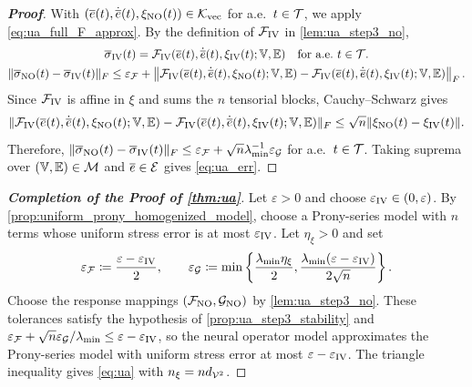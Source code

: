 \begin{proof}[\bf Proof]
With $(\overline e(t),\dot{\overline e}(t),\xi_{\mathrm{NO}}(t))\in{\mathcal{K}}_{\mathrm{vec}}$ for a.e.\ $t\in{\mathcal{T}}$, we apply \cref{eq:ua_full_F_approx}. By the definition of ${\mathcal{F}}_{\mathrm{IV}}$ in \cref{lem:ua_step3_no},
\begin{gather*}
{\overline\sigma_{\rm IV}}(t)={\mathcal{F}}_{\mathrm{IV}}(\overline e(t),\dot{\overline e}(t),\xi_{\mathrm{IV}}(t);\mathbb{V},\mathbb{E})
\quad \text{for a.e.\ } t\in{\mathcal{T}}.\\
\|\overline{\sigma}_{\mathrm{NO}}(t)-{\overline\sigma_{\rm IV}}(t)\|_F
\leq
\varepsilon_{{\mathcal{F}}}+
\left\|{\mathcal{F}}_{\mathrm{IV}}(\overline e(t),\dot{\overline e}(t),\xi_{\mathrm{NO}}(t);\mathbb{V},\mathbb{E})-{\mathcal{F}}_{\mathrm{IV}}(\overline e(t),\dot{\overline e}(t),\xi_{\mathrm{IV}}(t);\mathbb{V},\mathbb{E})\right\|_F.
\end{gather*}
Since ${\mathcal{F}}_{\mathrm{IV}}$ is affine in $\xi$ and sums the $n$ tensorial blocks, Cauchy--Schwarz gives
\begin{equation*}
\|{\mathcal{F}}_{\mathrm{IV}}(\overline e(t),\dot{\overline e}(t),\xi_{\mathrm{NO}}(t);\mathbb{V},\mathbb{E})-{\mathcal{F}}_{\mathrm{IV}}(\overline e(t),\dot{\overline e}(t),\xi_{\mathrm{IV}}(t);\mathbb{V},\mathbb{E})\|_F
\le \sqrt{n} \|\xi_{\mathrm{NO}}(t)-\xi_{\mathrm{IV}}(t)\|.
\end{equation*}
Therefore, $\|\overline{\sigma}_{\mathrm{NO}}(t)-{\overline\sigma_{\rm IV}}(t)\|_F\leq \varepsilon_{{\mathcal{F}}} + \sqrt{n}\lambda_{\min}^{-1}\varepsilon_{{\mathcal{G}}}$ for a.e.\ $t\in{\mathcal{T}}$. Taking suprema over $(\mathbb{V},\mathbb{E})\in{\mathcal{M}}$ and $\overline e\in{\mathcal{E}}$ gives \cref{eq:ua_err}.
\end{proof}

\begin{proof}[\bf Completion of the Proof of \cref{thm:ua}]
Let $\varepsilon>0$ and choose $\varepsilon_{\rm IV}\in(0,\varepsilon)$. By \cref{prop:uniform_prony_homogenized_model}, choose a Prony-series model with $n$ terms whose uniform stress error is at most $\varepsilon_{\rm IV}$. Let $\eta_\xi>0$ and set
\begin{equation}\label{eq:ua_error_tolerances}
\varepsilon_{{\mathcal{F}}}\coloneqq\frac{\varepsilon-\varepsilon_{\rm IV}}{2},\qquad
\varepsilon_{{\mathcal{G}}}\coloneqq\min\left\{\frac{\lambda_{\min}\eta_\xi}{2},\frac{\lambda_{\min}(\varepsilon-\varepsilon_{\rm IV})}{2\sqrt n}\right\}.
\end{equation}
Choose the response mappings $({\mathcal{F}}_{\rm NO},{\mathcal{G}}_{\rm NO})$ by \cref{lem:ua_step3_no}. These tolerances satisfy the hypothesis of \cref{prop:ua_step3_stability} and $\varepsilon_{{\mathcal{F}}}+\sqrt n\varepsilon_{{\mathcal{G}}}/\lambda_{\min}\le\varepsilon-\varepsilon_{\rm IV}$, so the neural operator model approximates the Prony-series model with uniform stress error at most $\varepsilon-\varepsilon_{\rm IV}$. The triangle inequality gives \cref{eq:ua} with $n_\xi=nd_{{\mathcal{V}}^2}$.
\end{proof}
